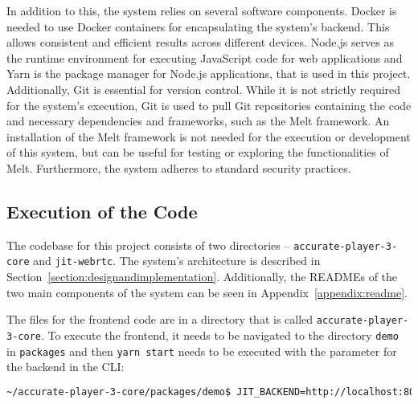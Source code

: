 \documentclass[../MasterThesis.tex]{subfiles}
\begin{document}
In addition to this, the system relies on several software components.
Docker is needed to use Docker containers for encapsulating the system's backend. This allows consistent and efficient results across different devices.
Node.js serves as the runtime environment for executing JavaScript code for web applications and Yarn is the package manager for Node.js applications, that is used in this project.
Additionally, Git is essential for version control. While it is not strictly required for the system's execution, Git is used to pull Git repositories containing the code and necessary dependencies and frameworks, such as the Melt framework. 
An installation of the Melt framework is not needed for the execution or development of this system, but can be useful for testing or exploring the functionalities of Melt.
%
Furthermore, the system adheres to standard security practices.


	
	
	
	
	
	








\subsection{Execution of the Code} \label{subsection:runninghtecode}

The codebase for this project consists of two directories -- \texttt{accurate-player-3-core} and \texttt{jit-webrtc}. The system's architecture is described in Section~\ref{section:designandimplementation}. Additionally, the READMEs of the two main components of the system can be seen in Appendix~\ref{appendix:readme}.


The files for the frontend code are in a directory that is called \texttt{accurate-player-3-core}. To execute the frontend, it needs to be navigated to the directory \texttt{demo} in \texttt{packages} and then \texttt{yarn start} needs to be executed with the parameter for the backend in the CLI:
\begin{lstlisting}[language=bash, numbers=none, columns=fullflexible]
	~/accurate-player-3-core/packages/demo$ JIT_BACKEND=http://localhost:8080 yarn start
\end{lstlisting}
\end{document}
